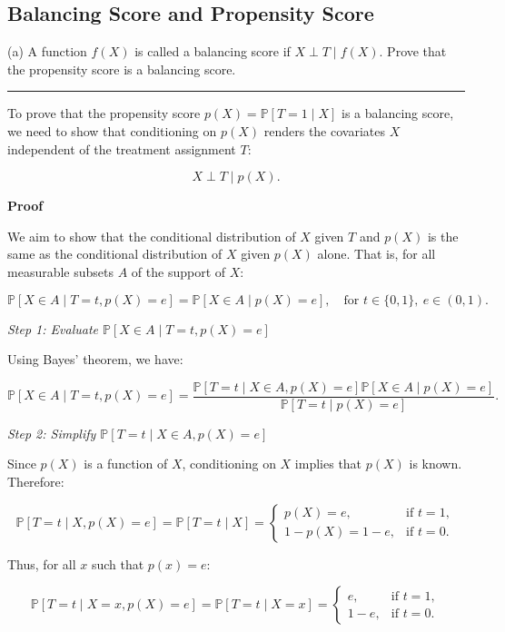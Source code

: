\documentclass{article}
\newenvironment{colorparagraph}[1]{\par\color{#1}}{\par}
\begin{document}
\begin{colorparagraph}{questioncolor}
\label{q2a}\subsection{Balancing Score and Propensity Score}
(a) A function \( f(X) \) is called a balancing score if \( X \perp T \mid f(X) \). Prove that the propensity score is a balancing score.

\rule{\textwidth}{0.5pt}
\end{colorparagraph}

To prove that the propensity score \( p(X) = \mathbb{P}[T = 1 \mid X] \) is a balancing score, we need to show that conditioning on \( p(X) \) renders the covariates \( X \) independent of the treatment assignment \( T \):

\[
X \perp T \mid p(X).
\]

\textbf{Proof}

We aim to show that the conditional distribution of \( X \) given \( T \) and \( p(X) \) is the same as the conditional distribution of \( X \) given \( p(X) \) alone. That is, for all measurable subsets \( A \) of the support of \( X \):

\[
\mathbb{P}[X \in A \mid T = t, p(X) = e] = \mathbb{P}[X \in A \mid p(X) = e], \quad \text{for } t \in \{0,1\}, \ e \in (0,1).
\]

\textit{Step 1: Evaluate \(\mathbb{P}[X \in A \mid T = t, p(X) = e]\)}

Using Bayes' theorem, we have:

\[
\mathbb{P}[X \in A \mid T = t, p(X) = e] = \frac{\mathbb{P}[T = t \mid X \in A, p(X) = e] \mathbb{P}[X \in A \mid p(X) = e]}{\mathbb{P}[T = t \mid p(X) = e]}.
\]

\textit{Step 2: Simplify \(\mathbb{P}[T = t \mid X \in A, p(X) = e]\)}

Since \( p(X) \) is a function of \( X \), conditioning on \( X \) implies that \( p(X) \) is known. Therefore:

\[
\mathbb{P}[T = t \mid X, p(X) = e] = \mathbb{P}[T = t \mid X] = 
\begin{cases}
p(X) = e, & \text{if } t = 1, \\
1 - p(X) = 1 - e, & \text{if } t = 0.
\end{cases}
\]

Thus, for all \( x \) such that \( p(x) = e \):

\[
\mathbb{P}[T = t \mid X = x, p(X) = e] = \mathbb{P}[T = t \mid X = x] = 
\begin{cases}
e, & \text{if } t = 1, \\
1 - e, & \text{if } t = 0.
\end{cases}
\]
\end{document}
